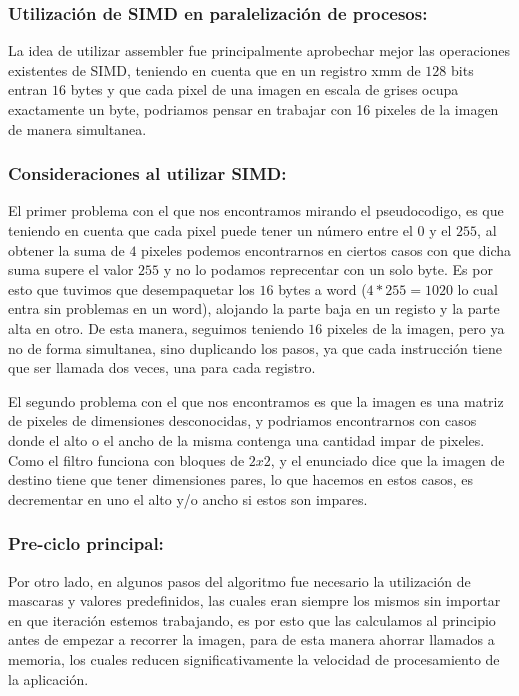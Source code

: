 \subsubsection{Utilización de SIMD en paralelización de procesos:}
La idea de utilizar assembler fue principalmente aprobechar mejor las operaciones existentes de SIMD, teniendo en cuenta que en un registro xmm de $128$ bits entran $16$ bytes y que cada pixel de una imagen en escala de grises ocupa exactamente un byte, podriamos pensar en trabajar con 16 pixeles de la imagen de manera simultanea. 

\subsubsection{Consideraciones al utilizar SIMD:}
El primer problema con el que nos encontramos mirando el pseudocodigo, es que teniendo en cuenta que cada pixel puede tener un número entre el $0$ y el $255$, al obtener la suma de $4$ pixeles podemos encontrarnos en ciertos casos con que dicha suma supere el valor $255$ y no lo podamos reprecentar con un solo byte. Es por esto que tuvimos que desempaquetar los $16$ bytes a word ($4*255 = 1020$ lo cual entra sin problemas en un word), alojando la parte baja en un registo y la parte alta en otro. De esta manera, seguimos teniendo $16$ pixeles de la imagen, pero ya no de forma simultanea, sino duplicando los pasos, ya que cada instrucción tiene que ser llamada dos veces, una para cada registro.

El segundo problema con el que nos encontramos es que la imagen es una matriz de pixeles de dimensiones desconocidas, y podriamos encontrarnos con casos donde el alto o el ancho de la misma contenga una cantidad impar de pixeles. Como el filtro funciona con bloques de $2x2$, y el enunciado dice que la imagen de destino tiene que tener dimensiones pares, lo que hacemos en estos casos, es decrementar en uno el alto y/o ancho si estos son impares.

\subsubsection{Pre-ciclo principal:}
Por otro lado, en algunos pasos del algoritmo fue necesario la utilización de mascaras y valores predefinidos, las cuales eran siempre los mismos sin importar en que iteración estemos trabajando, es por esto que las calculamos al principio antes de empezar a recorrer la imagen, para de esta manera ahorrar llamados a memoria, los cuales reducen significativamente la velocidad de procesamiento de la aplicación.


